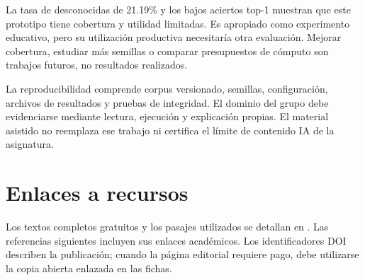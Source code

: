 La tasa de desconocidas de 21.19\% y los bajos aciertos top-1 muestran
que este prototipo tiene cobertura y utilidad limitadas. Es apropiado
como experimento educativo, pero su utilización productiva necesitaría
otra evaluación. Mejorar cobertura, estudiar más semillas o comparar
presupuestos de cómputo son trabajos futuros, no resultados realizados.

La reproducibilidad comprende corpus versionado, semillas, configuración,
archivos de resultados y pruebas de integridad. El dominio del grupo
debe evidenciarse mediante lectura, ejecución y explicación propias.
El material asistido no reemplaza ese trabajo ni certifica el límite
de contenido IA de la asignatura.

\section{Enlaces a recursos}

Los textos completos gratuitos y los pasajes utilizados se detallan
en . Las referencias siguientes
incluyen sus enlaces académicos. Los identificadores DOI describen la
publicación; cuando la página editorial requiere pago, debe utilizarse
la copia abierta enlazada en las fichas.
